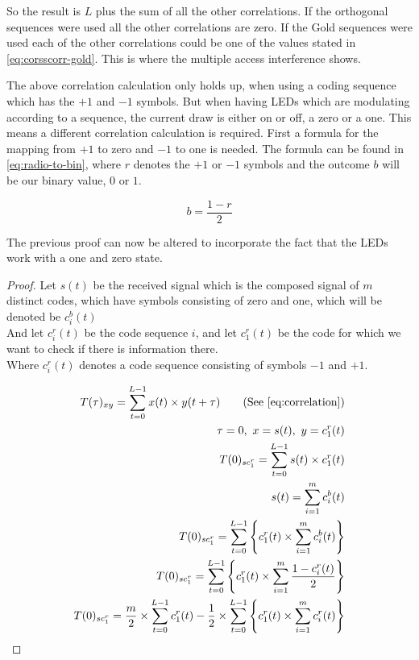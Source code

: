 So the result is $L$ plus the sum of all the other correlations. 
If the orthogonal sequences were used all the other correlations are zero.
If the Gold sequences were used each of the other correlations could be one of the values stated in \autoref{eq:corsscorr-gold}.
This is where the multiple access interference shows.



The above correlation calculation only holds up, when using a coding sequence which has the $+1$ and $-1$ symbols.
But when having LEDs which are modulating according to a sequence, the current draw is either on or off, a zero or a one.
This means a different correlation calculation is required.
First a formula for the mapping from $+1$ to zero and $-1$ to one is needed.
The formula can be found in \autoref{eq:radio-to-bin}, where $r$ denotes the $+1$ or $-1$ symbols and the outcome $b$ will be our binary value, $0$ or $1$.

\begin{equation}
	b = \frac{1 - r}{2}
	\label{eq:radio-to-bin}
\end{equation}


The previous proof can now be altered to incorporate the fact that the LEDs work with a one and zero state.


\begin{proof}
	Let $s(t)$ be the received signal which is the composed signal of $m$ distinct codes, which have symbols consisting of zero and one, which will be denoted be $c^b_i(t)$\\
	And let $c^r_i(t)$ be the code sequence $i$, and let $c^r_1(t)$ be the code for which we want to check if there is information there. \\
	Where $c^r_i(t)$ denotes a code sequence consisting of symbols $-1$ and $+1$.

	\begin{align*}
	T(\tau)_{xy} = \displaystyle\sum_{t = 0} ^ {L - 1} x(t) \times y(t + \tau)	\tag{See \autoref{eq:correlation}}
	\\ \tau = 0,\ x = s(t),\ y = c^r_1(t)
	\\ T(0)_{sc^r_{1}} = \displaystyle\sum_{t = 0} ^ {L - 1} s(t) \times c^r_1(t)	
	\\ s(t) = \displaystyle\sum_{i = 1} ^ {m} c^b_i(t)
	\\ T(0)_{sc^r_{1}} = \displaystyle\sum_{t = 0} ^ {L - 1} \Bigg\{  c^r_1(t)	\times \displaystyle\sum_{i = 1} ^ {m} c^b_i(t) 	\Bigg\}
	\\ T(0)_{sc^r_{1}} = \displaystyle\sum_{t = 0} ^ {L - 1} \Bigg\{  c^r_1(t)	\times \displaystyle\sum_{i = 1} ^ {m} \frac{1 - c^r_i(t)}{2}  	\Bigg\}
	\\ T(0)_{sc^r_{1}} = \frac{m}{2} \times \displaystyle\sum_{t = 0} ^ {L - 1} c^r_1(t) - \frac{1}{2} \times \displaystyle\sum_{t = 0} ^ {L - 1}  \Bigg\{ c^r_1(t) \times \displaystyle\sum_{i = 1} ^ {m} c^r_i(t) \Bigg\}
	\end{align*}

\end{proof}

